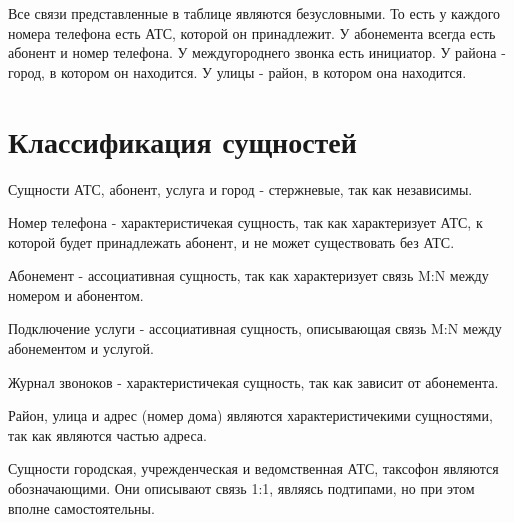 \documentclass{report}
\begin{document}
Все связи представленные в таблице являются безусловными. То есть у каждого 
номера телефона есть АТС, которой он принадлежит. У абонемента всегда
есть абонент и номер телефона. У междугороднего звонка есть инициатор. 
У района - город, в котором он находится. У улицы - район, в котором она 
находится.

\section{Классификация сущностей}

Сущности АТС, абонент, услуга и город - стержневые, так как независимы. 

Номер телефона - характеристичекая сущность, 
так как характеризует АТС, к которой будет принадлежать абонент, и не может
существовать без АТС.

Абонемент - ассоциативная сущность, так как характеризует связь M:N между номером и абонентом.

Подключение услуги - ассоциативная сущность, описывающая связь M:N между 
абонементом и услугой.

Журнал звоноков - характеристичекая сущность, так как 
зависит от абонемента.

Район, улица и адрес (номер дома) являются характеристичекими сущностями, 
так как являются частью адреса.

Сущности городская, учрежденческая и ведомственная АТС, таксофон являются
обозначающими. Они описывают связь 1:1, являясь подтипами, но при 
этом вполне самостоятельны. 
\end{document}
